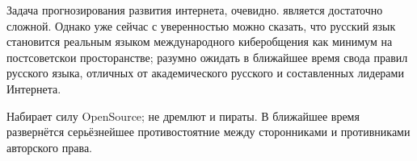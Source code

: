 Задача прогнозирования развития интернета, очевидно. является достаточно сложной.
Однако уже сейчас с уверенностью можно сказать, что русский язык становится реальным языком международного киберобщения как минимум на постсоветскои просторанстве; разумно ожидать в ближайшее время свода правил русского языка, отличных от академического русского и составленных лидерами Интернета.

Набирает силу OpenSource; не дремлют и пираты. В ближайшее время развернётся серьёзнейшее противостоятние между сторонниками и противниками авторского права.
